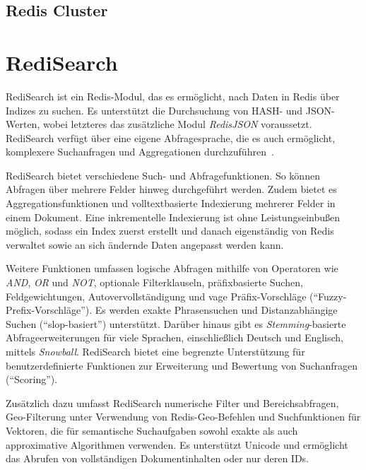 
\subsection{Redis Cluster}

\section{RediSearch}

RediSearch ist ein Redis-Modul, das es ermöglicht, nach Daten in Redis über Indizes zu suchen.
Es unterstützt die Durchsuchung von HASH- und JSON-Werten, wobei letzteres das zusätzliche Modul \emph{RedisJSON} voraussetzt.
RediSearch verfügt über eine eigene Abfragesprache, die es auch ermöglicht, komplexere Suchanfragen und Aggregationen durchzuführen~\cite{redis_ltd_search_nodate}. %

RediSearch bietet verschiedene Such- und Abfragefunktionen.
So können Abfragen über mehrere Felder hinweg durchgeführt werden.
Zudem bietet es Aggregationsfunktionen und volltextbasierte Indexierung mehrerer Felder in einem Dokument.
Eine inkrementelle Indexierung ist ohne Leistungseinbußen möglich, sodass ein Index zuerst erstellt und danach eigenständig von Redis verwaltet sowie an sich ändernde Daten angepasst werden kann.

Weitere Funktionen umfassen logische Abfragen mithilfe von Operatoren wie \emph{AND}, \emph{OR} und \emph{NOT}, optionale Filterklauseln, präfixbasierte Suchen, Feldgewichtungen, Autovervollständigung und vage Präfix-Vorschläge (\enquote{Fuzzy-Prefix-Vorschläge}).
Es werden exakte Phrasensuchen und Distanzabhängige Suchen (\enquote{slop-basiert}) unterstützt. Darüber hinaus gibt es \emph{Stemming}-basierte Abfrageerweiterungen für viele Sprachen, einschließlich Deutsch und Englisch, mittels \emph{Snowball}.
RediSearch bietet eine begrenzte Unterstützung für benutzerdefinierte Funktionen zur Erweiterung und Bewertung von Suchanfragen (\enquote{Scoring}).

Zusätzlich dazu umfasst RediSearch numerische Filter und Bereichsabfragen, Geo-Filterung unter Verwendung von Redis-Geo-Befehlen und Suchfunktionen für Vektoren, die für semantische Suchaufgaben sowohl exakte als auch approximative Algorithmen verwenden.
Es unterstützt Unicode und ermöglicht das Abrufen von vollständigen Dokumentinhalten oder nur deren IDs.


